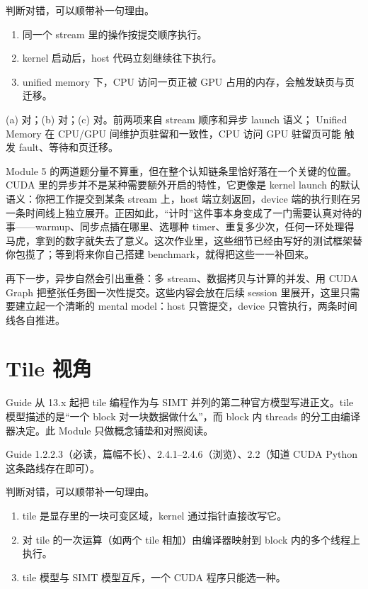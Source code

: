 \documentclass[11pt,a4paper,fontset=fandol]{ctexart}
\begin{document}
判断对错，可以顺带补一句理由。
\begin{enumerate}[label=(\alph*)]
  \item 同一个 stream 里的操作按提交顺序执行。
  \item kernel 启动后，host 代码立刻继续往下执行。
  \item unified memory 下，CPU 访问一页正被 GPU 占用的内存，会触发缺页与页迁移。
\end{enumerate}

\begin{answer}
(a) 对；(b) 对；(c) 对。前两项来自 stream 顺序和异步 launch 语义；
Unified Memory 在 CPU/GPU 间维护页驻留和一致性，CPU 访问 GPU 驻留页可能
触发 fault、等待和页迁移。
\end{answer}

\begin{lookback}
Module 5 的两道题分量不算重，但在整个认知链条里恰好落在一个关键的位置。CUDA 里的异步并不是某种需要额外开启的特性，它更像是 kernel launch 的默认语义：你把工作提交到某条 stream 上，host 端立刻返回，device 端的执行则在另一条时间线上独立展开。正因如此，“计时”这件事本身变成了一门需要认真对待的事——warmup、同步点插在哪里、选哪种 timer、重复多少次，任何一环处理得马虎，拿到的数字就失去了意义。这次作业里，这些细节已经由写好的测试框架替你包揽了；等到将来你自己搭建 benchmark，就得把这些一一补回来。

再下一步，异步自然会引出重叠：多 stream、数据拷贝与计算的并发、用 CUDA Graph 把整张任务图一次性提交。这些内容会放在后续 session 里展开，这里只需要建立起一个清晰的 mental model：host 只管提交，device 只管执行，两条时间线各自推进。
\end{lookback}

\section{Tile 视角}

Guide 从 13.x 起把 tile 编程作为与 SIMT 并列的第二种官方模型写进正文。tile 模型描述的是“一个 block 对一块数据做什么”，而 block 内 threads 的分工由编译器决定。此 Module 只做概念铺垫和对照阅读。

\begin{reading}
Guide 1.2.2.3（必读，篇幅不长）、2.4.1--2.4.6（浏览）、2.2（知道 CUDA Python 这条路线存在即可）。
\end{reading}

判断对错，可以顺带补一句理由。
\begin{enumerate}[label=(\alph*)]
  \item tile 是显存里的一块可变区域，kernel 通过指针直接改写它。
  \item 对 tile 的一次运算（如两个 tile 相加）由编译器映射到 block 内的多个线程上执行。
  \item tile 模型与 SIMT 模型互斥，一个 CUDA 程序只能选一种。
\end{enumerate}
\end{document}
